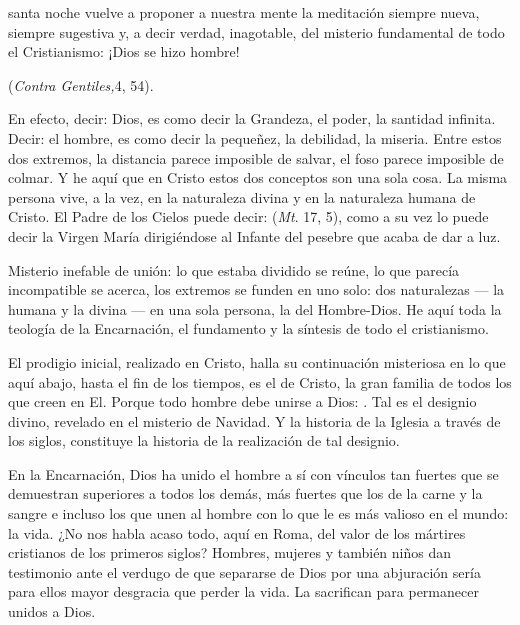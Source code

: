 \begin{body}
	 santa noche vuelve a proponer a nuestra mente la meditación siempre nueva, siempre sugestiva y, a decir verdad, inagotable, del misterio fundamental de todo el Cristianismo: ¡Dios se hizo hombre!
	
	 (\emph{Contra Gentiles,}4, 54).
	
	En efecto, decir: Dios, es como decir la Grandeza, el poder, la santidad infinita. Decir: el hombre, es como decir la pequeñez, la debilidad, la miseria. Entre estos dos extremos, la distancia parece imposible de salvar, el foso parece imposible de colmar. Y he aquí que en Cristo estos dos conceptos son una sola cosa. La misma persona vive, a la vez, en la naturaleza divina y en la naturaleza humana de Cristo. El Padre de los Cielos puede decir:  (\emph{Mt}. 17, 5), como a su vez lo puede decir la Virgen María dirigiéndose al Infante del pesebre que acaba de dar a luz.
	
	Misterio inefable de unión: lo que estaba dividido se reúne, lo que parecía incompatible se acerca, los extremos se funden en uno solo: dos naturalezas --- la humana y la divina --- en una sola persona, la del Hombre-Dios. He aquí toda la teología de la Encarnación, el fundamento y la síntesis de todo el cristianismo.
	
	El prodigio inicial, realizado en Cristo, halla su continuación misteriosa en lo que aquí abajo, hasta el fin de los tiempos, es el  de Cristo, la gran familia de todos los que creen en El. Porque todo hombre debe unirse a Dios: . Tal es el designio divino, revelado en el misterio de Navidad. Y la historia de la Iglesia a través de los siglos, constituye la historia de la realización de tal designio.
	
	En la Encarnación, Dios ha unido el hombre a sí con vínculos tan fuertes que se demuestran superiores a todos los demás, más fuertes que los de la carne y la sangre e incluso los que unen al hombre con lo que le es más valioso en el mundo: la vida. ¿No nos habla acaso todo, aquí en Roma, del valor de los mártires cristianos de los primeros siglos? Hombres, mujeres y también niños dan testimonio ante el verdugo de que separarse de Dios por una abjuración sería para ellos mayor desgracia que perder la vida. La sacrifican para permanecer unidos a Dios.
	

\end{body}
